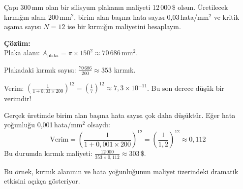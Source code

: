 \begin{ornek}[1.3]
Çapı 300\,mm olan bir silisyum plakanın maliyeti 12\,000\,\$ olsun. Üretilecek kırmığın alanı 200\,mm$^2$, birim alan başına hata sayısı 0{,}03\,hata/mm$^2$ ve kritik aşama sayısı $N=12$ ise bir kırmığın maliyetini hesaplayın.

\textbf{Çözüm:}\\
Plaka alanı: $A_\text{plaka} = \pi \times 150^2 \approx 70\,686$\,mm$^2$.

Plakadaki kırmık sayısı: $\displaystyle\frac{70\,686}{200} \approx 353$ kırmık.

Verim: $\displaystyle\left(\frac{1}{1 + 0{,}03 \times 200}\right)^{12} = \left(\frac{1}{7}\right)^{12} \approx 7{,}3 \times 10^{-11}$. Bu son derece düşük bir verimdir!

Gerçek üretimde birim alan başına hata sayısı çok daha düşüktür. Eğer hata yoğunluğu 0{,}001\,hata/mm$^2$ olsaydı:
\[
\text{Verim} = \left(\frac{1}{1 + 0{,}001 \times 200}\right)^{12} = \left(\frac{1}{1{,}2}\right)^{12} \approx 0{,}112
\]
Bu durumda kırmık maliyeti: $\displaystyle\frac{12\,000}{353 \times 0{,}112} \approx 303$\,\$.

Bu örnek, kırmık alanının ve hata yoğunluğunun maliyet üzerindeki dramatik etkisini açıkça gösteriyor.
\end{ornek}

